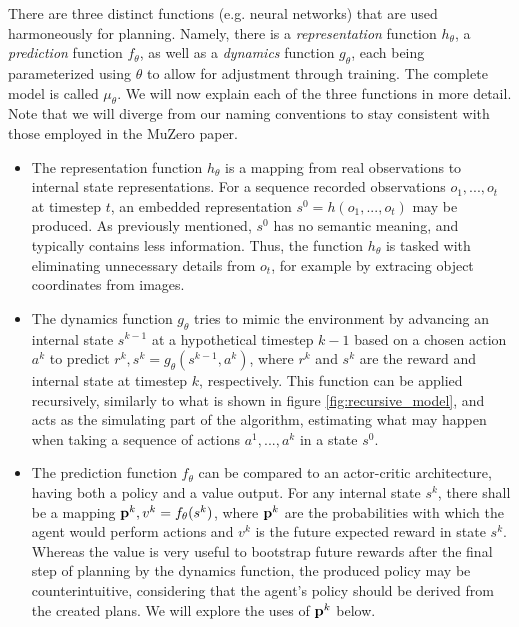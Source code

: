 There are three distinct functions (e.g. neural networks) that are used harmoneously for planning. Namely, there is a \textit{representation} function $h_\theta$, a \textit{prediction} function $f_\theta$, as well as a \textit{dynamics} function $g_\theta$, each being parameterized using $\theta$ to allow for adjustment through training. The complete model is called $\mu_\theta$. We will now explain each of the three functions in more detail. Note that we will diverge from our naming conventions to stay consistent with those employed in the MuZero paper.
\begin{itemize}
    \item The representation function $h_\theta$ is a mapping from real observations to internal state representations. For a sequence recorded observations $o_1, ..., o_t$ at timestep $t$, an embedded representation $s^0 = h(o_1, ..., o_t)$ may be produced. As previously mentioned, $s^0$ has no semantic meaning, and typically contains less information. Thus, the function $h_\theta$ is tasked with eliminating unnecessary details from $o_t$, for example by extracing object coordinates from images.

    \item The dynamics function $g_\theta$ tries to mimic the environment by advancing an internal state $s^{k-1}$ at a hypothetical timestep $k-1$ based on a chosen action $a^k$ to predict $r^k, s^k = g_\theta\left(s^{k-1}, a^k\right)$, where $r^k$ and $s^k$ are the reward and internal state at timestep $k$, respectively. This function can be applied recursively, similarly to what is shown in figure \ref{fig:recursive_model}, and acts as the simulating part of the algorithm, estimating what may happen when taking a sequence of actions $a^1, ..., a^k$ in a state $s^0$.

    \item The prediction function $f_\theta$ can be compared to an actor-critic architecture, having both a policy and a value output. For any internal state $s^k$, there shall be a mapping $\text{\textbf{p}}^k, v^k = f_\theta(s^k)$, where $\text{\textbf{p}}^k$ are the probabilities with which the agent would perform actions and $v^k$ is the future expected reward in state $s^k$. Whereas the value is very useful to bootstrap future rewards after the final step of planning by the dynamics function, the produced policy may be counterintuitive, considering that the agent's policy should be derived from the created plans. We will explore the uses of $\text{\textbf{p}}^k$ below.
\end{itemize}

